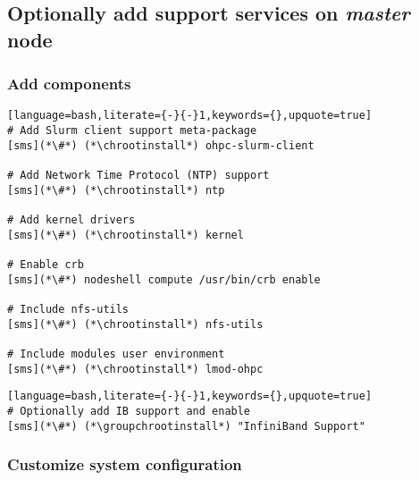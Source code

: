 \documentclass[letterpaper]{article}
\newcommand{\chrootinstall}{nodeshell compute dnf -y install}
\newcommand{\groupchrootinstall}{nodeshell compute dnf -y groupinstall}
\begin{document}
\subsection{Optionally add \OmniPath{} support services on {\em master} node} \label{sec:add_opa}


\vspace*{0.2cm}
\subsubsection{Add \OHPC{} components} \label{sec:add_components}


\begin{lstlisting}[language=bash,literate={-}{-}1,keywords={},upquote=true]
# Add Slurm client support meta-package
[sms](*\#*) (*\chrootinstall*) ohpc-slurm-client

# Add Network Time Protocol (NTP) support
[sms](*\#*) (*\chrootinstall*) ntp

# Add kernel drivers
[sms](*\#*) (*\chrootinstall*) kernel

# Enable crb 
[sms](*\#*) nodeshell compute /usr/bin/crb enable

# Include nfs-utils  
[sms](*\#*) (*\chrootinstall*) nfs-utils

# Include modules user environment
[sms](*\#*) (*\chrootinstall*) lmod-ohpc
\end{lstlisting}



\begin{lstlisting}[language=bash,literate={-}{-}1,keywords={},upquote=true]
# Optionally add IB support and enable
[sms](*\#*) (*\groupchrootinstall*) "InfiniBand Support"
\end{lstlisting}

\vspace*{-0.25cm}
\subsubsection{Customize system configuration} \label{sec:master_customization}

\end{document}
